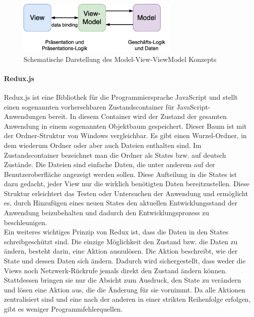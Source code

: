 \documentclass[notables, nomenclature, oneside, 150]{HSMW-Thesis}
\begin{document}
			\begin{figure}[h!]
    			\centering
    			\includegraphics[width=0.7\textwidth]{img/mvvm}
    			\caption{Schematische Darstellung des Model-View-ViewModel Konzepts}
    			\label{fig:mvvm}
    		\end{figure}
    		
		\vspace{-5mm}
		\paragraph*{Redux.js}
			Redux.js ist eine Bibliothek für die Programmiersprache JavaScript und stellt einen sogenannten vorhersehbaren Zustandscontainer für JavaScript-Anwendungen bereit. In diesem Container wird der Zustand der gesamten Anwendung in einem sogenannten Objektbaum gespeichert. Dieser Baum ist mit der Ordner-Struktur von Windows vergleichbar. Es gibt einen Wurzel-Ordner, in dem wiederum Ordner oder aber auch Dateien enthalten sind. Im Zustandscontainer bezeichnet man die Ordner als States bzw. auf deutsch Zustände. Die Dateien sind einfache Daten, die unter anderem auf der Benutzeroberfläche angezeigt werden sollen. Diese Aufteilung in die States ist dazu gedacht, jeder View nur die wirklich benötigten Daten bereitzustellen. Diese Struktur erleichtert das Testen oder Untersuchen der Anwendung und ermöglicht es, durch Hinzufügen eines neuen States den aktuellen Entwicklungsstand der Anwendung beizubehalten und dadurch den Entwicklungsprozess zu beschleunigen. \\
			Ein weiteres wichtiges Prinzip von Redux ist, dass die Daten in den States schreibgeschützt sind. Die einzige Möglichkeit den Zustand bzw. die Daten zu ändern, besteht darin, eine Aktion auszulösen. Die Aktion beschreibt, wie der State und dessen Daten sich ändern. Dadurch wird sichergestellt, dass weder die Views noch Netzwerk-Rückrufe jemals direkt den Zustand ändern können. Stattdessen bringen sie nur die Absicht zum Ausdruck, den State zu verändern und lösen eine Aktion aus, die die Änderung für sie vornimmt. Da alle Aktionen zentralisiert sind und eine nach der anderen in einer strikten Reihenfolge erfolgen, gibt es weniger Programmfehlerquellen.
\end{document}
